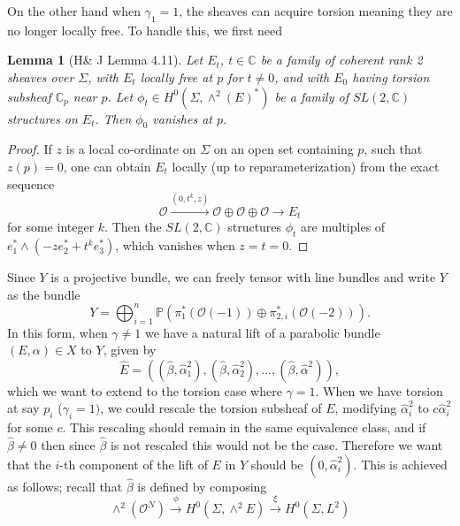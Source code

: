 \documentclass[]{article}
\newtheorem{lemma}{Lemma}
\newcommand{\C}{\mathbb{C}}
\newcommand{\OO}{\mathcal{O}}
\newcommand{\PP}{\mathbb{P}}
\begin{document}
	On the other hand when $\gamma_1 = 1$, the sheaves can acquire torsion meaning they are no longer locally free. To handle this, we first need
	\begin{lemma}[H\& J Lemma 4.11]
		Let $E_t$, $t\in\C$ be a family of coherent rank 2 sheaves over $\Sigma$, with $E_t$ locally free at $p$ for $t\neq 0$, and with $E_0$ having torsion subsheaf $\C_p$ near $p$. Let $\phi_t \in H^0(\Sigma, \wedge^2(E)^\ast)$ be a family of $SL(2,\C)$ structures on $E_t$. Then $\phi_0$ vanishes at $p$.
		\label{t:sl2-lemma}
	\end{lemma}
	\begin{proof}
		If $z$ is a local co-ordinate on $\Sigma$ on an open set containing $p$, such that $z(p)=0$, one can obtain $E_t$ locally (up to reparameterization) from the exact sequence 
		\begin{equation}
			\OO \xrightarrow{(0,t^k,z)} \OO \oplus \OO \oplus \OO \xrightarrow{~~~~~}E_t
		\end{equation}
		for some integer $k$. Then the $SL(2,\C)$ structures $\phi_t$ are multiples of $e_1^\ast \wedge (-ze^\ast_2 + t^k e^\ast_3)$, which vanishes when $z=t=0$.
	\end{proof}
	Since $Y$ is a projective bundle, we can freely tensor with line bundles and write $Y$ as the bundle
	\begin{equation}
		Y = \bigoplus_{i=1}^n\PP\left(\pi_1^\ast\left(
		\OO(-1)
		\right)\oplus \pi_{2,i}^\ast\left(\OO(-2)\right)\right).
	\end{equation}
	In this form, when $\gamma \neq 1$ we have a natural lift of a parabolic bundle $(E,\alpha)\in X$ to $Y$, given by 
	\begin{equation}
		\hat{E} = \left(
		(\hat{\beta}, \hat{\alpha}_1^2),(\hat{\beta},\hat{\alpha}_2^2),...,(\hat{\beta},\hat{\alpha}^2)
		\right),
	\end{equation}
	which we want to extend to the torsion case where $\gamma = 1$. When we have torsion at say $p_i$ ($\gamma_i = 1)$, we could rescale the torsion subsheaf of $E$, modifying $\hat{\alpha}_i^2$ to $c\hat{\alpha}_i^2$ for some $c$. This rescaling should remain in the same equivalence class, and if $\hat{\beta} \neq 0$ then since $\hat{\beta}$ is not rescaled this would not be the case. Therefore we want that the $i$-th component of the lift of $E$ in $Y$ should be $(0,\hat{\alpha}_i^2)$. This is achieved as follows; recall that $\hat{\beta}$ is defined by composing
	\begin{equation}
		\wedge^2(\OO^N) \xrightarrow{\phi} H^0(\Sigma, \wedge^2 E) \xrightarrow{\xi} H^0(\Sigma, L^2)
	\end{equation}
\end{document}
